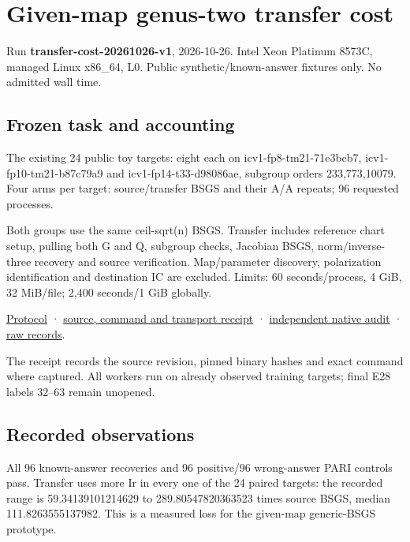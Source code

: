 \documentclass[
  10pt,
]{article}
\author{}
\date{}
\begin{document}
\section{Given-map genus-two transfer
cost}\label{given-map-genus-two-transfer-cost}

Run \textbf{transfer-cost-20261026-v1}, 2026-10-26. Intel Xeon Platinum
8573C, managed Linux x86\_64, L0. Public synthetic/known-answer fixtures
only. No admitted wall time.

\subsection{Frozen task and
accounting}\label{frozen-task-and-accounting}

The existing 24 public toy targets: eight each on
icv1-fp8-tm21-71e3bcb7, icv1-fp10-tm21-b87c79a9 and
icv1-fp14-t33-d98086ae, subgroup orders 233,773,10079. Four arms per
target: source/transfer BSGS and their A/A repeats; 96 requested
processes.

Both groups use the same ceil-sqrt(n) BSGS. Transfer includes reference
chart setup, pulling both G and Q, subgroup checks, Jacobian BSGS,
norm/inverse-three recovery and source verification. Map/parameter
discovery, polarization identification and destination IC are excluded.
Limits: 60 seconds/process, 4 GiB, 32 MiB/file; 2,400 seconds/1 GiB
globally.

\href{../../../execution-v3/TRANSFER_COST_PROTOCOL_V1.md}{Protocol} ·
\href{../../../execution-v3/runs/transfer-cost-20261026-v1.transport.json}{source,
command and transport receipt} ·
\href{../../../execution-v3/transfer-cost-audit-20261026-v1/AUDIT.json}{independent
native audit} ·
\href{../../../execution-v3/runs/transfer-cost-20261026-v1/RECORDS.json}{raw
records}.

The receipt records the source revision, pinned binary hashes and exact
command where captured. All workers run on already observed training
targets; final E28 labels 32--63 remain unopened.

\subsection{Recorded observations}\label{recorded-observations}

All 96 known-answer recoveries and 96 positive/96 wrong-answer PARI
controls pass. Transfer uses more Ir in every one of the 24 paired
targets: the recorded range is 59.34139101214629 to 289.80547820363523
times source BSGS, median 111.8263555137982. This is a measured loss for
the given-map generic-BSGS prototype.
\end{document}
